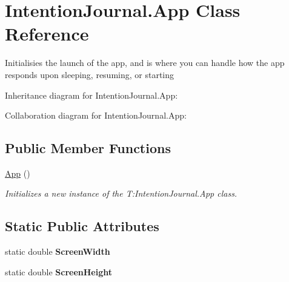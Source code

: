 \hypertarget{class_intention_journal_1_1_app}{}\section{Intention\+Journal.\+App Class Reference}
\label{class_intention_journal_1_1_app}


Initialisies the launch of the app, and is where you can handle how the app responds upon sleeping, resuming, or starting  




Inheritance diagram for Intention\+Journal.\+App\+:


Collaboration diagram for Intention\+Journal.\+App\+:
\subsection*{Public Member Functions}
\begin{DoxyCompactItemize}
\item 
\hyperlink{class_intention_journal_1_1_app_a1e234615d8a625add447d7fb0fdcd1db}{App} ()
\begin{DoxyCompactList}\small\item\em Initializes a new instance of the T\+:\+Intention\+Journal.\+App class. \end{DoxyCompactList}\end{DoxyCompactItemize}
\subsection*{Static Public Attributes}
\begin{DoxyCompactItemize}
\item 
\mbox{\label{class_intention_journal_1_1_app_a2fe79dd9845233fba88cfe0e16234117}} 
static double {\bfseries Screen\+Width}
\item 
\mbox{\label{class_intention_journal_1_1_app_ab00faf4e5d33b78bf504e3b1f1ed8d8a}} 
static double {\bfseries Screen\+Height}
\end{DoxyCompactItemize}
